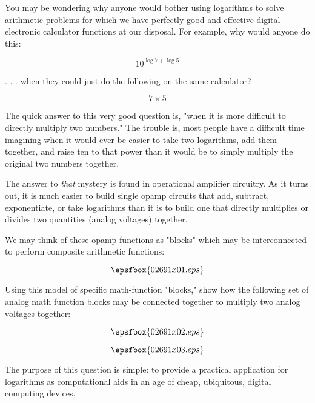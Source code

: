 

You may be wondering why anyone would bother using logarithms to solve arithmetic problems for which we have perfectly good and effective digital electronic calculator functions at our disposal.  For example, why would anyone do this:

$$10^{\log 7 + \log 5}$$

. . . when they could just do the following on the same calculator?

$$7 \times 5$$

The quick answer to this very good question is, "when it is more difficult to directly multiply two numbers."  The trouble is, most people have a difficult time imagining when it would ever be easier to take two logarithms, add them together, and raise ten to that power than it would be to simply multiply the original two numbers together.

The answer to {\it that} mystery is found in operational amplifier circuitry.  As it turns out, it is much easier to build single opamp circuits that add, subtract, exponentiate, or take logarithms than it is to build one that directly multiplies or divides two quantities (analog voltages) together.

We may think of these opamp functions as "blocks" which may be interconnected to perform composite arithmetic functions:

$$\epsfbox{02691x01.eps}$$

Using this model of specific math-function "blocks," show how the following set of analog math function blocks may be connected together to multiply two analog voltages together:

$$\epsfbox{02691x02.eps}$$







$$\epsfbox{02691x03.eps}$$







The purpose of this question is simple: to provide a practical application for logarithms as computational aids in an age of cheap, ubiquitous, digital computing devices.




